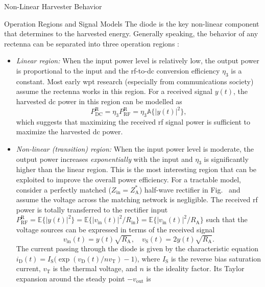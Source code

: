 \begin{section}{}
\begin{subsection}{Non-Linear Harvester Behavior}
		\begin{subsubsection}{Operation Regions and Signal Models}\label{sc:operation_regions}
			The diode is the key non-linear component that determines to the harvested energy.
			Generally speaking, the behavior of any rectenna can be separated into three operation regions \cite{Clerckx2016a}:
			\begin{itemize}
				\item \emph{Linear region:} When the input power level is relatively low, the output power is proportional to the input and the \gls{rf}-to-\gls{dc} conversion efficiency $\eta_3$ is a constant. Most early \gls{wpt} research (especially from communications society) assume the rectenna works in this region. For a received signal $y(t)$, the harvested \gls{dc} power in this region can be modelled as
				\begin{equation}
					P_\mathrm{DC}^\mathrm{R} = \eta_3 P_\mathrm{RF}^\mathrm{R} = \eta_3 \mathbb{A}\bigl\{ \lvert y(t) \rvert^2 \bigr\},
					\label{eq:dc_power_linear}
				\end{equation}
				which suggests that maximizing the received \gls{rf} signal power is sufficient to maximize the harvested \gls{dc} power.
				\item \emph{Non-linear (transition) region:} When the input power level is moderate, the output power increases \emph{exponentially} with the input and $\eta_3$ is significantly higher than the linear region. This is the most interesting region that can be exploited to improve the overall power efficiency.
				For a tractable model, consider a perfectly matched ($Z_\mathrm{in} = Z_\mathrm{A}^*$) half-wave rectifier in Fig.~ and assume the voltage across the matching network is negligible. The received \gls{rf} power is totally transferred to the rectifier input $P_\mathrm{RF}^\mathrm{R} = \mathbb{E}\bigl\{ \lvert y(t) \rvert^2 \bigr\} = \mathbb{E}\bigl\{ \lvert v_\mathrm{in}(t) \rvert^2 / R_\mathrm{in} \bigr\} = \mathbb{E}\bigl\{ \lvert v_\mathrm{in}(t) \rvert^2 / R_\mathrm{A} \bigr\}$ such that the voltage sources can be expressed in terms of the received signal \cite{Clerckx2016a}
				\begin{equation}
					v_\mathrm{in}(t) = y(t) \sqrt{R_\mathrm{A}}, \quad v_\mathrm{S}(t) = 2 y(t) \sqrt{R_\mathrm{A}}.
				\end{equation}
				The current passing through the diode is given by the characteristic equation $i_\mathrm{D}(t) = I_\mathrm{S} \bigl( \exp(v_\mathrm{D}(t) / n v_\mathrm{T}) - 1 \bigr)$, where $I_\mathrm{S}$ is the reverse bias saturation current, $v_\mathrm{T}$ is the thermal voltage, and $n$ is the ideality factor. Its Taylor expansion around the steady point $-v_\mathrm{out}$ is \cite{Clerckx2016a}

\end{itemize}
\end{subsubsection}
\end{subsection}
\end{section}
